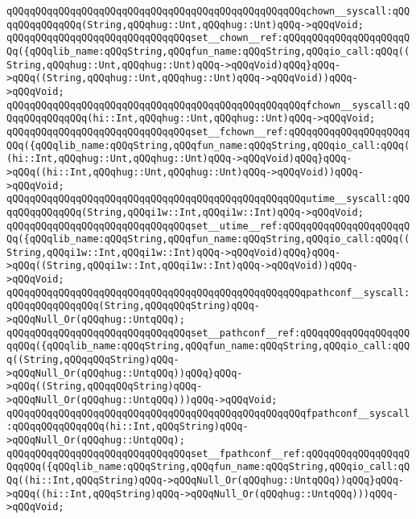 \newline
\verb|qQQqqQQqqQQqqQQqqQQqqQQqqQQqqQQqqQQqqQQqqQQqqQQqqQQqchown__syscall:qQQqqQQqqQQqqQQq(String,qQQqhug::Unt,qQQqhug::Unt)qQQq->qQQqVoid;|\newline
\verb|qQQqqQQqqQQqqQQqqQQqqQQqqQQqqQQqset__chown__ref:qQQqqQQqqQQqqQQqqQQqqQQq({qQQqlib_name:qQQqString,qQQqfun_name:qQQqString,qQQqio_call:qQQq((String,qQQqhug::Unt,qQQqhug::Unt)qQQq->qQQqVoid)qQQq}qQQq->qQQq((String,qQQqhug::Unt,qQQqhug::Unt)qQQq->qQQqVoid))qQQq->qQQqVoid;|\newline
\newline
\verb|qQQqqQQqqQQqqQQqqQQqqQQqqQQqqQQqqQQqqQQqqQQqqQQqqQQqfchown__syscall:qQQqqQQqqQQqqQQq(hi::Int,qQQqhug::Unt,qQQqhug::Unt)qQQq->qQQqVoid;|\newline
\verb|qQQqqQQqqQQqqQQqqQQqqQQqqQQqqQQqset__fchown__ref:qQQqqQQqqQQqqQQqqQQqqQQq({qQQqlib_name:qQQqString,qQQqfun_name:qQQqString,qQQqio_call:qQQq((hi::Int,qQQqhug::Unt,qQQqhug::Unt)qQQq->qQQqVoid)qQQq}qQQq->qQQq((hi::Int,qQQqhug::Unt,qQQqhug::Unt)qQQq->qQQqVoid))qQQq->qQQqVoid;|\newline
\newline
\verb|qQQqqQQqqQQqqQQqqQQqqQQqqQQqqQQqqQQqqQQqqQQqqQQqqQQqutime__syscall:qQQqqQQqqQQqqQQq(String,qQQqi1w::Int,qQQqi1w::Int)qQQq->qQQqVoid;|\newline
\verb|qQQqqQQqqQQqqQQqqQQqqQQqqQQqqQQqset__utime__ref:qQQqqQQqqQQqqQQqqQQqqQQq({qQQqlib_name:qQQqString,qQQqfun_name:qQQqString,qQQqio_call:qQQq((String,qQQqi1w::Int,qQQqi1w::Int)qQQq->qQQqVoid)qQQq}qQQq->qQQq((String,qQQqi1w::Int,qQQqi1w::Int)qQQq->qQQqVoid))qQQq->qQQqVoid;|\newline
\newline
\verb|qQQqqQQqqQQqqQQqqQQqqQQqqQQqqQQqqQQqqQQqqQQqqQQqqQQqpathconf__syscall:qQQqqQQqqQQqqQQq(String,qQQqqQQqString)qQQq->qQQqNull_Or(qQQqhug::UntqQQq);|\newline
\verb|qQQqqQQqqQQqqQQqqQQqqQQqqQQqqQQqset__pathconf__ref:qQQqqQQqqQQqqQQqqQQqqQQq({qQQqlib_name:qQQqString,qQQqfun_name:qQQqString,qQQqio_call:qQQq((String,qQQqqQQqString)qQQq->qQQqNull_Or(qQQqhug::UntqQQq))qQQq}qQQq->qQQq((String,qQQqqQQqString)qQQq->qQQqNull_Or(qQQqhug::UntqQQq)))qQQq->qQQqVoid;|\newline
\newline
\verb|qQQqqQQqqQQqqQQqqQQqqQQqqQQqqQQqqQQqqQQqqQQqqQQqqQQqfpathconf__syscall:qQQqqQQqqQQqqQQq(hi::Int,qQQqString)qQQq->qQQqNull_Or(qQQqhug::UntqQQq);|\newline
\verb|qQQqqQQqqQQqqQQqqQQqqQQqqQQqqQQqset__fpathconf__ref:qQQqqQQqqQQqqQQqqQQqqQQq({qQQqlib_name:qQQqString,qQQqfun_name:qQQqString,qQQqio_call:qQQq((hi::Int,qQQqString)qQQq->qQQqNull_Or(qQQqhug::UntqQQq))qQQq}qQQq->qQQq((hi::Int,qQQqString)qQQq->qQQqNull_Or(qQQqhug::UntqQQq)))qQQq->qQQqVoid;|\newline
